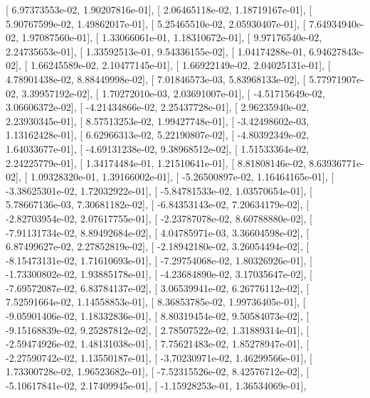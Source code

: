 \documentclass{article}
\begin{document}
       [  6.97373553e-02,   1.90207816e-01],
       [  2.06465118e-02,   1.18719167e-01],
       [  5.90767599e-02,   1.49862017e-01],
       [  5.25465510e-02,   2.05930407e-01],
       [  7.64934940e-02,   1.97087560e-01],
       [  1.33066061e-01,   1.18310672e-01],
       [  9.97176540e-02,   2.24735653e-01],
       [  1.33592513e-01,   9.54336155e-02],
       [  1.04174288e-01,   6.94627843e-02],
       [  1.66245589e-02,   2.10477145e-01],
       [  1.66922149e-02,   2.04025131e-01],
       [  4.78901438e-02,   8.88449998e-02],
       [  7.01846573e-03,   5.83968133e-02],
       [  5.77971907e-02,   3.39957192e-02],
       [  1.70272010e-03,   2.03691007e-01],
       [ -4.51715649e-02,   3.06606372e-02],
       [ -4.21434866e-02,   2.25437728e-01],
       [  2.96235940e-02,   2.23930345e-01],
       [  8.57513253e-02,   1.99427748e-01],
       [ -3.42498602e-03,   1.13162428e-01],
       [  6.62966313e-02,   5.22190807e-02],
       [ -4.80392349e-02,   1.64033677e-01],
       [ -4.69131238e-02,   9.38968512e-02],
       [  1.51533364e-02,   2.24225779e-01],
       [  1.34174484e-01,   1.21510641e-01],
       [  8.81808146e-02,   8.63936771e-02],
       [  1.09328320e-01,   1.39166002e-01],
       [ -5.26500897e-02,   1.16464165e-01],
       [ -3.38625301e-02,   1.72032922e-01],
       [ -5.84781533e-02,   1.03570654e-01],
       [  5.78667136e-03,   7.30681182e-02],
       [ -6.84353143e-02,   7.20634179e-02],
       [ -2.82703954e-02,   2.07617755e-01],
       [ -2.23787078e-02,   8.60788880e-02],
       [ -7.91131734e-02,   8.89492684e-02],
       [  4.04785971e-03,   3.36604598e-02],
       [  6.87499627e-02,   2.27852819e-02],
       [ -2.18942180e-02,   3.26054494e-02],
       [ -8.15473131e-02,   1.71610693e-01],
       [ -7.29754068e-02,   1.80326926e-01],
       [ -1.73300802e-02,   1.93885178e-01],
       [ -4.23684890e-02,   3.17035647e-02],
       [ -7.69572087e-02,   6.83784137e-02],
       [  3.06539941e-02,   6.26776112e-02],
       [  7.52591664e-02,   1.14558853e-01],
       [  8.36853785e-02,   1.99736405e-01],
       [ -9.05901406e-02,   1.18332836e-01],
       [  8.80319454e-02,   9.50584073e-02],
       [ -9.15168839e-02,   9.25287812e-02],
       [  2.78507522e-02,   1.31889314e-01],
       [ -2.59474926e-02,   1.48131038e-01],
       [  7.75621483e-02,   1.85278947e-01],
       [ -2.27590742e-02,   1.13550187e-01],
       [ -3.70230971e-02,   1.46299566e-01],
       [  1.73300728e-02,   1.96523682e-01],
       [ -7.52315526e-02,   8.42576712e-02],
       [ -5.10617841e-02,   2.17409945e-01],
       [ -1.15928253e-01,   1.36534069e-01],
\end{document}
